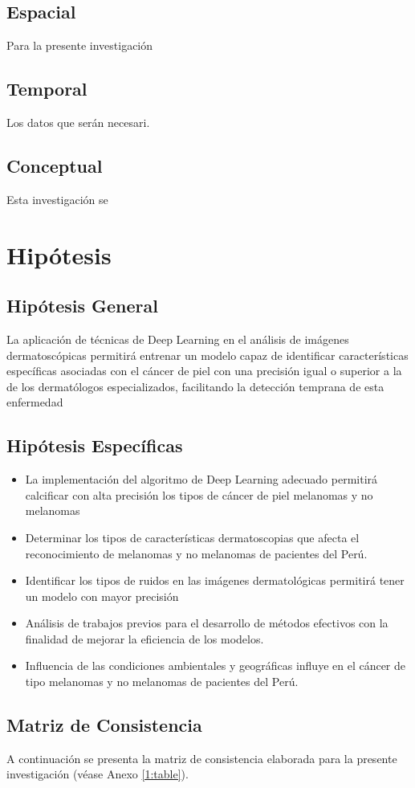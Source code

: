 \subsection{Espacial}
Para la presente investigación 

\subsection{Temporal}
Los datos que serán necesari. 

\subsection{Conceptual}
Esta investigación se 

\section{Hipótesis}

\subsection{Hipótesis General}
\newcommand{\HipotesisGeneral}{
La aplicación de técnicas de Deep Learning en el análisis de imágenes dermatoscópicas permitirá entrenar un modelo capaz de identificar características específicas asociadas con el cáncer de piel con una precisión igual o superior a la de los dermatólogos especializados, facilitando la detección temprana de esta enfermedad

}
\HipotesisGeneral
\subsection{Hipótesis Específicas}
\newcommand{\Hone}{
	La implementación del algoritmo de Deep Learning adecuado permitirá calcificar con alta precisión los tipos de cáncer de piel melanomas y no melanomas
	
}
\newcommand{\Htwo}{
	Determinar los tipos de características dermatoscopias que afecta el reconocimiento de melanomas y no melanomas de pacientes del Perú.
	
}
\newcommand{\Hthree}{
	Identificar los tipos de ruidos en las imágenes dermatológicas permitirá tener un modelo con mayor precisión
		
}
\newcommand{\Hfour}{
	Análisis de trabajos previos para el desarrollo de métodos efectivos con la finalidad de mejorar la eficiencia de los modelos.
	
}
\newcommand{\Hfive}{
	Influencia de las condiciones ambientales y geográficas influye en el cáncer de tipo melanomas y no melanomas de pacientes del Perú.
}
\begin{itemize}
	\item \Hone
	\item \Htwo
	\item \Hthree
	\item \Hfour
	\item \Hfive
\end{itemize}

\subsection{Matriz de Consistencia}
A continuación se presenta la matriz de consistencia elaborada para la presente investigación (véase Anexo \ref{1:table}).

